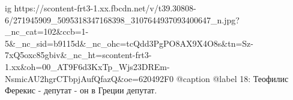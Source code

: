 
 
 
 
 

\ifcmt
  ig https://scontent-frt3-1.xx.fbcdn.net/v/t39.30808-6/271945909_5095318347168398_3107644937093400647_n.jpg?_nc_cat=102&ccb=1-5&_nc_sid=b9115d&_nc_ohc=tcQdd3PgPO8AX9X4O8s&tn=Sz-7xQ5oxc85gbiv&_nc_ht=scontent-frt3-1.xx&oh=00_AT9F6d3KxTp_Wjs23DREm-NsmicAU2hgrCTbpjAufQfazQ&oe=620492F0
  @caption @label 18: Теофилис Ферекис - депутат - он в Греции депутат.
\fi
